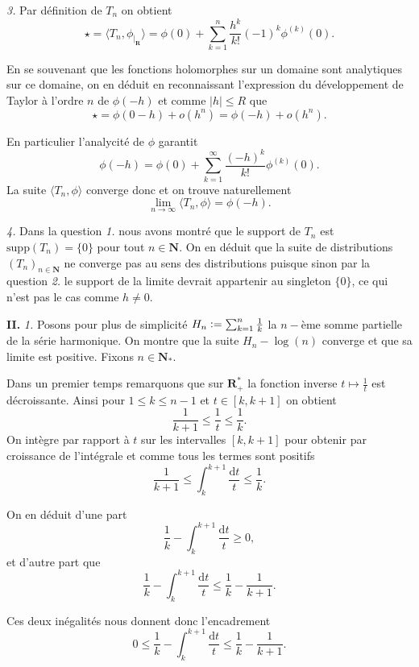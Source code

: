 \documentclass[12pt]{article}
\newcommand{\defeq}{\vcentcolon=}
\newcommand{\R}{\mathbf{R}}
\newcommand{\N}{\mathbf{N}}
\newcommand{\de}{\mathrm{d}}
\begin{document}
\textit{3.} Par définition de $T_{n}$ on obtient \[
        \star = \langle T_{n}, \phi_{|_{\R}} \rangle = \phi(0) + \sum_{k=1}^{n} \frac{h^{k}}{k!}(-1)^{k}\phi^{(k)}(0)
.\] 

En se souvenant que les fonctions holomorphes sur un domaine sont analytiques sur ce domaine, on en déduit en reconnaissant l'expression du développement de Taylor à l'ordre $n$ de $\phi(-h)$ et comme $|h| \le R$ que \[
        \star = \phi(0-h) + o(h^{n}) = \phi(-h) + o(h^{n})
.\] 

En particulier l'analycité de $\phi$ garantit  \[
        \phi(-h) = \phi(0) + \sum_{k=1}^{\infty} \frac{(-h)^{k}}{k!}\phi^{(k)}(0)
        .\] La suite $\langle T_{n}, \phi \rangle$ converge donc et on trouve naturellement \[
\boxed{\lim_{n\to \infty}\langle T_{n}, \phi \rangle = \phi(-h).}
\]  

\medskip

\textit{4.} Dans la question \textit{1.} nous avons montré que le support de $T_{n}$ est $\mathrm{supp}(T_{n}) = \{0\}$ pour tout $n \in \N$. On en déduit que la suite de distributions $(T_{n})_{n\in \N}$ ne converge pas au sens des distributions puisque sinon par la question \textit{2.} le support de la limite devrait appartenir au singleton $\{0\}$, ce qui n'est pas le cas comme $h \neq 0$. 

\newpage

\textbf{II.} \textit{1.} Posons pour plus de simplicité $H_{n} \defeq \sum_{k=1}^{n} \frac{1}{k}$ la $n-$ème somme partielle de la série harmonique. On montre que la suite $H_{n} - \log(n)$ converge et que sa limite est positive. Fixons $n \in \N_{*}$.

Dans un premier temps remarquons que sur $\R_{+}^{*}$ la fonction inverse $t \longmapsto \frac{1}{t}$ est décroissante. Ainsi pour $1 \le k \le n-1$ et $t \in [k, k+1]$ on obtient \[
\frac{1}{k+1} \le \frac{1}{t} \le \frac{1}{k}
.\] 
On intègre par rapport à $t$ sur les intervalles $[k, k+1]$ pour obtenir par croissance de l'intégrale et comme tous les termes sont positifs
\[
\frac{1}{k+1} \le \int_{k}^{k+1} \frac{\de t}{t} \le \frac{1}{k}
.\] 

On en déduit d'une part \[
        \frac{1}{k} - \int_{k}^{k+1} \frac{\de t}{t} \ge 0 
,\] et d'autre part que \[
\frac{1}{k} - \int_{k}^{k+1}\frac{\de t}{t} \le \frac{1}{k} - \frac{1}{k+1}
.\]  

Ces deux inégalités nous donnent donc l'encadrement \[
0 \le \frac{1}{k} - \int_{k}^{k+1}\frac{\de t}{t} \le \frac{1}{k} - \frac{1}{k+1}
.\] 
\end{document}
